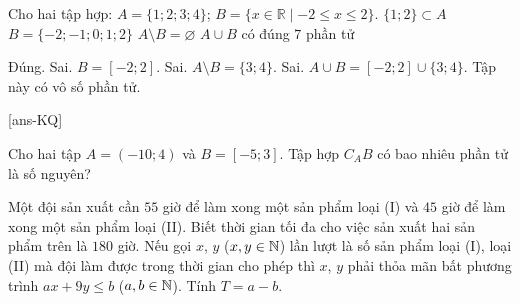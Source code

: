 \begin{ex}%
	Cho hai tập hợp:
	$A=\{1;2;3;4\}$; $B=\{x \in\mathbb{R} \mid-2 \le x \le 2\}$.
	\choiceTF
	{\True $\{1; 2\} \subset A$}
	{$B = \{-2; -1; 0; 1; 2\}$}
	{$A \setminus B = \varnothing$}
	{$A \cup B$ có đúng $7$ phần tử}
	\loigiai
	{
		\begin{itemchoice}
			\itemch Đúng.
			\itemch Sai. $B=[-2;2]$.
			\itemch Sai. $A\setminus B=\{3;4\}$.
			\itemch Sai. $A\cup B=[-2;2]\cup \{3;4\}$. Tập này có vô số phần tử.
		\end{itemchoice}
	}
\end{ex}
%
\TNSA

[ans-KQ]
\begin{ex}%
	Cho hai tập $A=(-10; 4)$ và $B=[-5; 3]$. Tập hợp $C_A B$ có bao nhiêu phần tử là số nguyên?
\end{ex}

\begin{ex}%
	Một đội sản xuất cần $55$ giờ để làm xong một sản phẩm loại (I) và $45$ giờ để làm xong một sản phẩm loại (II). Biết thời gian tối đa cho việc sản xuất hai sản phẩm trên là $180$ giờ. Nếu gọi $x$, $y$ ($x, y\in \Bbb{N}$) lần lượt là số sản phẩm loại (I), loại (II) mà đội làm được trong thời gian cho phép thì $x$, $y$ phải thỏa mãn bất phương trình $ax+9y\le b$ ($a, b\in \Bbb{N}$). Tính $T=a-b$.
\end{ex}

